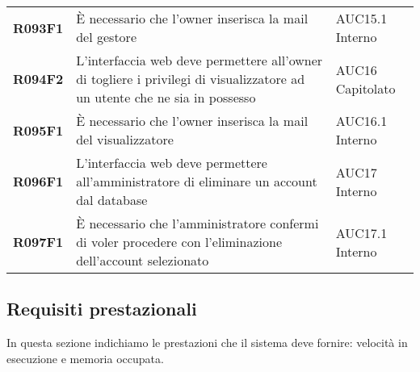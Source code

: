 \documentclass[../analisi-dei-requisiti.tex]{subfiles}
\begin{document}
\begin{longtable}[H]{>{\centering\bfseries}m{3cm} >{\centering}m{10cm} >{\centering\arraybackslash}m{3cm}}
  R093F1                               & È necessario che l'owner inserisca la mail del gestore                                                                                                                                                  & AUC15.1 Interno               \\
  R094F2                               & L'interfaccia web deve permettere all'owner di togliere i privilegi di visualizzatore ad un utente che ne sia in possesso                                                                               & AUC16 Capitolato              \\
  R095F1                               & È necessario che l'owner inserisca la mail del visualizzatore                                                                                                                                           & AUC16.1 Interno               \\
  R096F1                               & L'interfaccia web deve permettere all'amministratore di eliminare un account dal database                                                                                                               & AUC17 Interno                 \\
  R097F1                               & È necessario che l'amministratore confermi di voler procedere con l'eliminazione dell'account selezionato                                                                                               & AUC17.1 Interno               \\
\end{longtable}

\newpage
\subsection{Requisiti prestazionali}%
\label{sub:requisiti_prestazionali}
In questa sezione indichiamo le prestazioni che il sistema deve fornire: velocità in esecuzione e memoria occupata.
\end{document}
